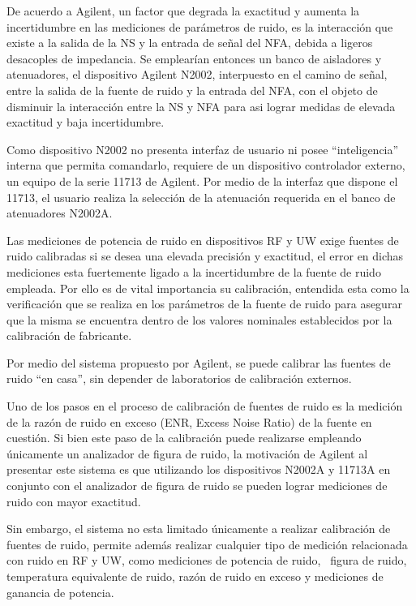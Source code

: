 \documentclass[paper=letter,oneside,fontsize=10pt,parskip=full]{article}
\begin{document}
De acuerdo a Agilent, un factor que degrada la exactitud y aumenta la incertidumbre en las mediciones de parámetros de
ruido, es la interacción que existe a la salida de la NS y la entrada de señal del NFA, debida a ligeros desacoples de
impedancia. Se emplearían entonces un banco de aisladores y atenuadores, el dispositivo Agilent N2002, interpuesto en
el camino de señal, entre la salida de la fuente de ruido y la entrada del NFA, con el objeto de disminuir la
interacción entre la NS y NFA para asi lograr medidas de elevada exactitud y baja incertidumbre.

Como dispositivo N2002 no presenta interfaz de usuario ni posee “inteligencia” interna que permita comandarlo, requiere
de un dispositivo controlador externo, un equipo de la serie 11713 de Agilent. Por medio de la interfaz que dispone el
11713, el usuario realiza la selección de la atenuación requerida en el banco de atenuadores N2002A.

Las mediciones de potencia de ruido en dispositivos RF y UW exige fuentes de ruido calibradas si se desea una elevada
precisión y exactitud, el error en dichas mediciones esta fuertemente ligado a la incertidumbre de la fuente de ruido
empleada. Por ello es de vital importancia su calibración, entendida esta como la verificación que se realiza en los
parámetros de la fuente de ruido para asegurar que la misma se encuentra dentro de los valores nominales establecidos
por la calibración de fabricante. 

Por medio del sistema propuesto por Agilent, se puede calibrar las fuentes de ruido “en casa”, sin depender de
laboratorios de calibración externos.

Uno de los pasos en el proceso de calibración de fuentes de ruido es la medición de la razón de ruido en exceso (ENR,
Excess Noise Ratio) de la fuente en cuestión. Si bien este paso de la calibración puede realizarse empleando únicamente
un analizador de figura de ruido, la motivación de Agilent al presentar este sistema es que utilizando los dispositivos
N2002A y 11713A en conjunto con el analizador de figura de ruido se pueden lograr mediciones de ruido con mayor
exactitud. 

Sin embargo, el sistema no esta limitado únicamente a realizar calibración de fuentes de ruido, permite además realizar
cualquier tipo de medición relacionada con ruido en RF y UW, como mediciones de potencia de ruido, \ figura de ruido,
temperatura equivalente de ruido, razón de ruido en exceso y mediciones de ganancia de potencia.
\end{document}
